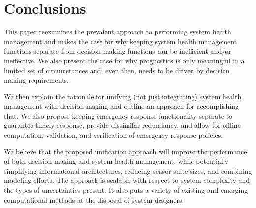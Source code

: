 \section{Conclusions}
\label{sec:conclusions}

This paper reexamines the prevalent approach to performing system health management and makes the case for why keeping system health management functions separate from decision making functions can be inefficient and/or ineffective. We also present the case for why prognostics is only meaningful in a limited set of circumstances and, even then, needs to be driven by decision making requirements.

We then explain the rationale for unifying (not just integrating) system health management with decision making and outline an approach for accomplishing that. We also propose keeping emergency response functionality separate to guarantee timely response, provide dissimilar redundancy, and allow for offline computation, validation, and verification of emergency response policies.

We believe that the proposed unification approach will improve the performance of both decision making and system health management, while potentially simplifying informational architectures, reducing sensor suite sizes, and combining modeling efforts. The approach is scalable with respect to system complexity and the types of uncertainties present. It also puts a variety of existing and emerging computational methods at the disposal of system designers.

